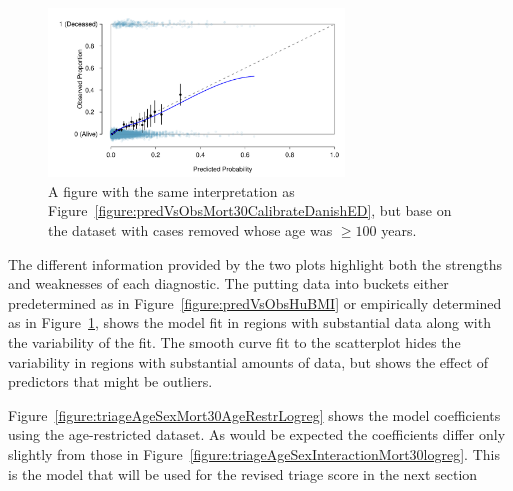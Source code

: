 \begin{figure}[!tbh]
  \centering
  \includegraphics[width=0.70\textwidth]
  {ch_logistic_regression_oi_biostat/figures/predVsObsMort30CalibrateAgeLT100DanishED/predVsObsMort30CalibrateAgeLT100DanishED.pdf}
    \caption{A figure with the same interpretation as Figure~\ref{figure:predVsObsMort30CalibrateDanishED}, but base on the dataset with cases removed whose age was $\ge 100$ years.}
    \label{figure:predVsObsMort30CalibrateAgeLT100DanishED}
\end{figure}

The different information provided by the two plots highlight both the strengths and weaknesses of each diagnostic. The putting data into buckets either predetermined as in Figure~\ref{figure:predVsObsHuBMI} or empirically determined as in Figure~\ref{figure:predVsObsMort30CalibrateAgeLT100DanishED}, shows the model fit in regions with substantial data along with the variability of the fit.  The smooth curve fit to the scatterplot hides the variability in regions with substantial amounts of data, but shows the effect of predictors that might be outliers.

Figure~\ref{figure:triageAgeSexMort30AgeRestrLogreg} shows the model coefficients using the age-restricted dataset. As would be expected the coefficients differ only slightly from those in Figure~\ref{figure:triageAgeSexInteractionMort30logreg}. This is the model that will be used for the revised triage score in the next section

